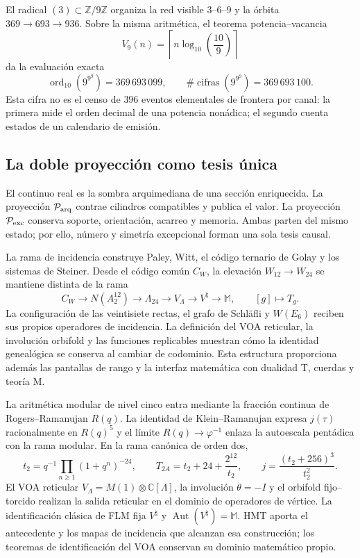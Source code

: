 El radical \((3)\subset\mathbb Z/9\mathbb Z\) organiza la red visible
\(3\)--\(6\)--\(9\) y la órbita \(369\to693\to936\). Sobre la misma
aritmética, el teorema potencia--vacancia
\[
 V_9(n)=\left\lceil n\log_{10}\!\left(\frac{10}{9}\right)\right\rceil
\]
da la evaluación exacta
\[
 \operatorname{ord}_{10}\!\left(9^{9^9}\right)=369\,693\,099,
 \qquad
 \#\operatorname{cifras}\!\left(9^{9^9}\right)=369\,693\,100.
\]
Esta cifra no es el censo de \(396\) eventos elementales de frontera por
canal: la primera mide el
orden decimal de una potencia nonádica; el segundo cuenta estados de un
calendario de emisión.

\subsection*{La doble proyección como tesis única}

El continuo real es la sombra arquimediana de una sección enriquecida. La
proyección \(\mathcal P_{\rm arq}\) contrae cilindros compatibles y publica
el valor. La proyección \(\mathcal P_{\rm exc}\) conserva soporte,
orientación, acarreo y memoria. Ambas parten del mismo estado; por ello,
número y simetría excepcional forman una sola tesis causal.

La rama de incidencia construye Paley, Witt, el código ternario de Golay y
los sistemas de Steiner. Desde el código común \(C_W\), la elevación
\(W_{12}\to W_{24}\) se mantiene distinta de la rama
\[
 C_W\to N(A_2^{12})\to\Lambda_{24}\to
 V_\Lambda\to V^\natural\to\mathbb M,
 \qquad [g]\longmapsto T_g.
\]
La configuración de las veintisiete rectas, el grafo de Schläfli y
\(W(E_6)\) reciben sus propios operadores de incidencia. La definición del
VOA reticular, la involución orbifold y las funciones replicables muestran
cómo la identidad genealógica se conserva al cambiar de codominio. Esta
estructura proporciona además las pantallas de rango y la interfaz
matemática con dualidad T, cuerdas y teoría M.

La aritmética modular de nivel cinco entra mediante la fracción continua de
Rogers--Ramanujan \(R(q)\). La identidad de Klein--Ramanujan expresa
\(j(\tau)\) racionalmente en \(R(q)^5\) y el límite
\(R(q)\to\varphi^{-1}\) enlaza la autoescala pentádica con la rama modular.
En la rama canónica de orden dos,
\[
 t_2=q^{-1}\prod_{n\ge1}(1+q^n)^{-24},\qquad
 T_{2A}=t_2+24+\frac{2^{12}}{t_2},
 \qquad j=\frac{(t_2+256)^3}{t_2^2}.
\]
El VOA reticular
\(V_\Lambda=M(1)\otimes\mathbb C[\Lambda]\), la involución
\(\theta=-I\) y el orbifold fijo--torcido realizan la salida reticular en el
dominio de operadores de vértice. La identificación clásica de FLM fija
\(V^\natural\) y \(\operatorname{Aut}(V^\natural)=\mathbb M\). HMT aporta
el antecedente y los mapas de incidencia que alcanzan esa construcción; los
teoremas de identificación del VOA conservan su dominio matemático propio.

